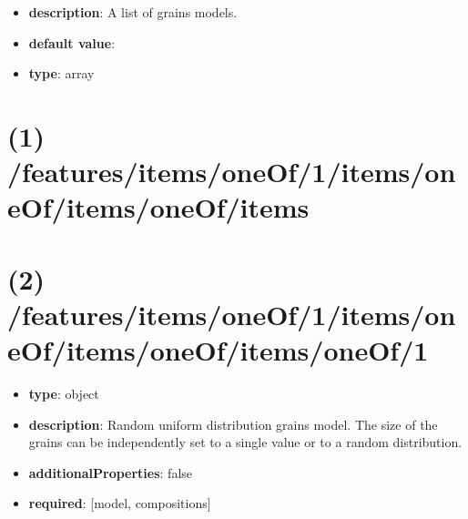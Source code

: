 \begin{itemize}[leftmargin=0em]\item {\bf description}: A list of grains models.
\item {\bf default value}: 
\item {\bf type}: array
\end{itemize}\section{(1) /features/items/oneOf/1/items/oneOf/items/oneOf/items}

\section{(2) /features/items/oneOf/1/items/oneOf/items/oneOf/items/oneOf/1}
\begin{itemize}[leftmargin=2em]\item {\bf type}: object
\item {\bf description}: Random uniform distribution grains model. The size of the grains can be independently set to a single value or to a random distribution.
\item {\bf additionalProperties}: false
\item {\bf required}: [model, compositions]\end{itemize}
